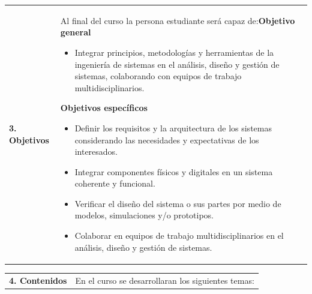 \documentclass[letterpaper]{article}%
\begin{document}
\vspace*{4mm}%
\newline%
\begin{tabularx}{\textwidth}{p{3cm}p{13cm}}%
\par\fontsize{12}{14}\selectfont \textbf{\textcolor{parte}{3. Objetivos}}&Al final del curso la persona estudiante será capaz de:\newline\newline \textbf{Objetivo general}\begin{itemize}\item Integrar principios, metodologías y herramientas de la ingeniería de sistemas en el análisis, diseño y gestión de sistemas, colaborando con equipos de trabajo multidisciplinarios.\end{itemize} \vspace{2mm}\textbf{Objetivos específicos}\begin{itemize}\item Definir los requisitos y la arquitectura de los sistemas considerando las necesidades y expectativas de los interesados.\item Integrar componentes físicos y digitales en un sistema coherente y funcional.\item Verificar el diseño del sistema o sus partes por medio de modelos, simulaciones y/o prototipos.\item Colaborar en equipos de trabajo multidisciplinarios en el análisis, diseño y gestión de sistemas.\end{itemize}\\%
\end{tabularx}%
\newpage%
\begin{tabularx}{\textwidth}{p{3cm}p{13cm}}%
\par\fontsize{12}{14}\selectfont \textbf{\textcolor{parte}{4. Contenidos}}&En el curso se desarrollaran los siguientes temas:\\%
\end{tabularx}%
\newline%
\end{document}

